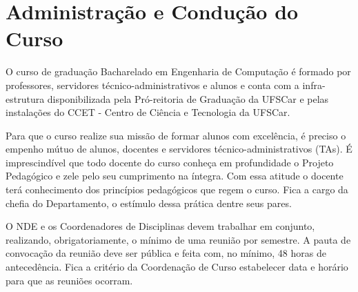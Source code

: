 



\section{Administração e Condução do Curso}

O curso de graduação Bacharelado em Engenharia de Computação é formado por professores, servidores técnico-administrativos e alunos e conta com a infra-estrutura disponibilizada pela Pró-reitoria de Graduação da UFSCar e pelas instalações do CCET - Centro de Ciência e Tecnologia da UFSCar.

Para que o curso realize sua missão de formar alunos com excelência, é preciso o empenho mútuo de alunos, docentes e servidores técnico-administrativos (TAs).
É imprescindível que todo docente do curso conheça em profundidade o Projeto Pedagógico e zele pelo seu cumprimento na íntegra. Com essa atitude o docente terá conhecimento dos princípios pedagógicos que regem o curso. Fica a cargo da chefia do Departamento, o estímulo dessa prática dentre seus pares.

O NDE e os Coordenadores de Disciplinas devem trabalhar em conjunto, realizando, obrigatoriamente, o mínimo de uma reunião por semestre. A pauta de convocação da reunião deve ser pública e feita com, no mínimo, 48 horas de antecedência. Fica a critério da Coordenação de Curso estabelecer data e horário para que as reuniões ocorram.

